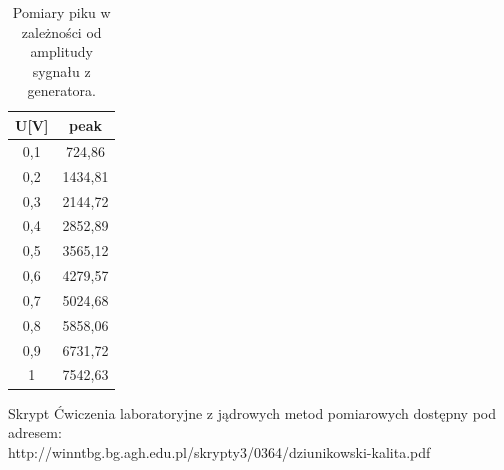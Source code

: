 \documentclass[11pt,a4paper]{article}
\begin{document}
\begin{longtable}{c|c}
	\caption{Pomiary piku w zależności od amplitudy sygnału z generatora.}\\
\label{dt2}
U[V]	&peak	\\ \hline
\endhead
0,1	&724,86 \\
0,2	&1434,81 \\
0,3	&2144,72 \\
0,4	&2852,89 \\
0,5	&3565,12 \\
0,6	&4279,57 \\
0,7	&5024,68 \\
0,8	&5858,06 \\
0,9	&6731,72 \\
1	&7542,63 \\
\end{longtable}

\begin{thebibliography}{9}
Skrypt Ćwiczenia laboratoryjne z jądrowych metod pomiarowych dostępny pod adresem:\\http://winntbg.bg.agh.edu.pl/skrypty3/0364/dziunikowski-kalita.pdf 
\end{thebibliography}
\end{document}
